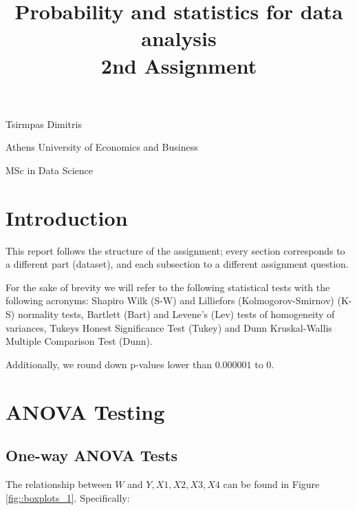 \documentclass[12pt, a4paper]{article}
\title{\Huge Probability and statistics for data analysis\\ \LARGE 2nd Assignment }
\begin{document}
	
	\begin{titlepage}
		\maketitle
		\begin{center}
			
			\LARGE Tsirmpas Dimitris
			
			\large Athens University of Economics and Business
			
			\large MSc in Data Science
			
		\end{center}
		
	\end{titlepage}
	
	\tableofcontents
	\newpage
	
	
	\section{Introduction}
	
	This report follows the structure of the assignment; every section corresponds to a different part (dataset), and each subsection to a different assignment question.
	
	For the sake of brevity we will refer to the following statistical tests with the following acronyms: Shapiro Wilk (S-W) and Lilliefors (Kolmogorov-Smirnov) (K-S) normality tests, Bartlett (Bart) and Levene's (Lev) tests of homogeneity of variances, Tukeys Honest Significance Test (Tukey) and Dunn Kruskal-Wallis Multiple Comparison Test (Dunn).
	
	Additionally, we round down p-values lower than $0.000001$ to 0.
	
	
	\section{ANOVA Testing}
	
	\subsection{One-way ANOVA Tests}
	
	The relationship between $W$ and $Y, X1, X2, X3, X4$ can be found in Figure \ref{fig::boxplots_1}. Specifically:
	
\end{document}
